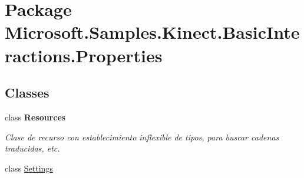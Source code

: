 \hypertarget{namespace_microsoft_1_1_samples_1_1_kinect_1_1_basic_interactions_1_1_properties}{\section{Package Microsoft.\-Samples.\-Kinect.\-Basic\-Interactions.\-Properties}
\label{namespace_microsoft_1_1_samples_1_1_kinect_1_1_basic_interactions_1_1_properties}
}
\subsection*{Classes}
\begin{DoxyCompactItemize}
\item 
class {\bfseries Resources}
\begin{DoxyCompactList}\small\item\em Clase de recurso con establecimiento inflexible de tipos, para buscar cadenas traducidas, etc. \end{DoxyCompactList}\item 
class \hyperlink{class_microsoft_1_1_samples_1_1_kinect_1_1_basic_interactions_1_1_properties_1_1_settings}{Settings}
\end{DoxyCompactItemize}
